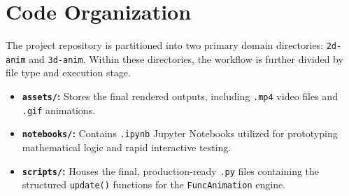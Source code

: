 \documentclass[12pt, a4paper]{report}
\begin{document}
\section{Code Organization}
The project repository is partitioned into two primary domain directories: \texttt{2d-anim} and \texttt{3d-anim}. Within these directories, the workflow is further divided by file type and execution stage.

\begin{itemize}
    \item \textbf{\texttt{assets/}:} Stores the final rendered outputs, including \texttt{.mp4} video files and \texttt{.gif} animations.
    \item \textbf{\texttt{notebooks/}:} Contains \texttt{.ipynb} Jupyter Notebooks utilized for prototyping mathematical logic and rapid interactive testing.
    \item \textbf{\texttt{scripts/}:} Houses the final, production-ready \texttt{.py} files containing the structured \texttt{update()} functions for the \texttt{FuncAnimation} engine.
\end{itemize}

\vspace{2cm}
\end{document}
